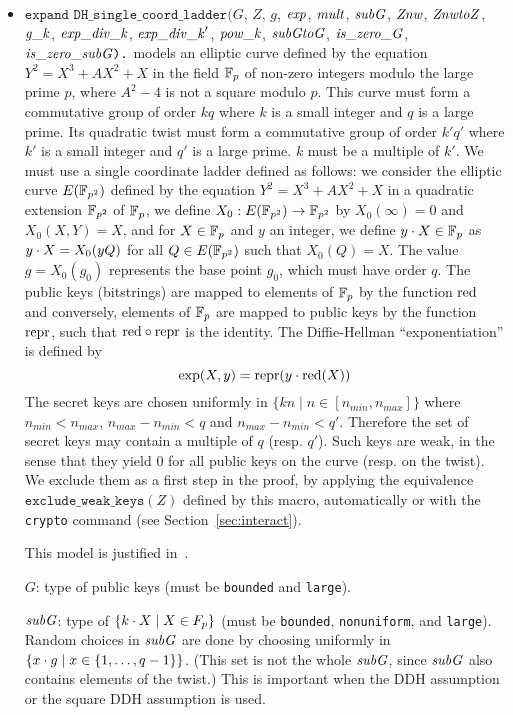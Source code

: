 \documentclass{article}
\begin{document}
\begin{itemize}
\begin{itemize}
\begin{itemize}
     \item $\texttt{expand\ DH\_single\_coord\_ladder}(G$, $Z$, $g$, $\mathit{exp}$, $\mathit{mult}$, $\mathit{subG}$, $\mathit{Znw}$, $\mathit{ZnwtoZ}$, $\mathit{g\_k}$, $\mathit{exp\_div\_k}$, $\mathit{exp\_div\_k}'$, $\mathit{pow\_k}$, $\mathit{subGtoG}$, $\mathit{is\_zero\_G}$, $\mathit{is\_zero\_subG}\texttt{).}$ models an elliptic curve defined by the equation
   $Y^2 = X^3 + A X^2 + X$ in the field $\mathbb{F}_p$ of non-zero integers modulo the 
   large prime $p$, where $A^2 - 4$ is not a square modulo $p$.
   This curve must form a commutative group of order $kq$ where $k$ is a 
   small integer and $q$ is a large prime.
   Its quadratic twist must form a commutative group of order $k'q'$ where $k'$
   is a small integer and $q'$ is a large prime.
   $k$ must be a multiple of $k'$.
   We must use a single coordinate ladder defined as follows: we
   consider the elliptic curve $E(\mathbb{F}_{p^2})$ defined by the equation $Y^2 =
   X^3 + A X^2 + X$ in a quadratic extension $\mathbb{F}_{p^2}$ of $\mathbb{F}_p$, we define 
   $X_0 : E(\mathbb{F}_{p^2}) \rightarrow \mathbb{F}_{p^2}$ by $X_0(\infty) = 0$ and $X_0(X,Y) = X$, and 
   for $X \in \mathbb{F}_p$ and $y$ an integer, we define ${y}\cdot{X} \in \mathbb{F}_p$ as ${y}\cdot{X} = X_0(yQ)$
   for all $Q \in E(\mathbb{F}_{p^2})$ such that $X_0(Q) = X$.
   The value $g = X_0(g_0)$ represents the base point $g_0$, which must have order $q$.
   The public keys (bitstrings) are mapped to elements of $\mathbb{F}_p$ by the function 
   $\mathrm{red}$ and conversely, elements of $\mathbb{F}_p$ are mapped to public keys by
   the function $\mathrm{repr}$, such that $\mathrm{red} \circ \mathrm{repr}$ is the identity.
   The Diffie-Hellman ``exponentiation'' is defined by 
      \[\exp(X,y) = \mathrm{repr}({y}\cdot{\mathrm{red}(X)})\]
   The secret keys are chosen uniformly in $\{ kn \mid n \in [n_{min},n_{max}] \}$
   where $n_{min} < n_{max}$, $n_{max} - n_{min} < q$ and $n_{max} - n_{min} < q'$.
   Therefore the set of secret keys may contain a multiple of $q$ (resp. $q'$).
   Such keys are weak, in the sense that they yield 0 for all public
   keys on the curve (resp. on the twist). We exclude them as a first step
   in the proof, by applying the equivalence $\texttt{exclude\_weak\_keys}(Z)$
   defined by this macro, automatically or with the
   \texttt{crypto} command (see Section~\ref{sec:interact}).

This model is justified in~\cite{LippBlanchetBharagavanInria19}.

       $G$: type of public keys (must be \texttt{bounded} and \texttt{large}).

       $\mathit{subG}$: type of $\{ {k}\cdot{X} \mid X \in F_p \}$  (must be \texttt{bounded}, \texttt{nonuniform}, and \texttt{large}). 
     Random choices in $\mathit{subG}$ are done by choosing uniformly in 
     $\{ {x}\cdot{g} \mid x \in \{ 1, \dots, q-1 \} \}$. (This set is not the whole $\mathit{subG}$,
     since $\mathit{subG}$ also contains elements of the twist.)
     This is important when the DDH assumption or the square DDH assumption
     is used.
       


\end{itemize}
\end{itemize}
\end{itemize}
\end{document}
